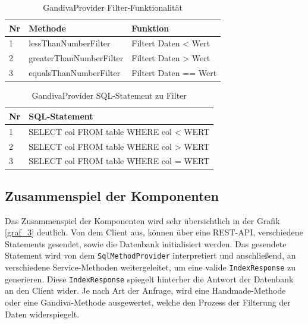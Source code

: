 \begin{table}[H]
\begin{center}
    \begin{tabular}{| l | l | l |}
    \hline
     Nr & Methode & Funktion \\ \hline
    1 & lessThanNumberFilter & Filtert Daten < Wert  \\ \hline
    2 & greaterThanNumberFilter & Filtert Daten > Wert \\ \hline
    3 & equalsThanNumberFilter & Filtert Daten == Wert  \\ \hline
    \end{tabular}
\end{center}
\caption{GandivaProvider Filter-Funktionalität}
\label{GandivaProvider Filter-Funktionalität}
\end{table}

\begin{table}[H]
\begin{center}
    \begin{tabular}{| l | l |}
    \hline
     Nr & SQL-Statement \\ \hline
    1 & SELECT col FROM table WHERE col < WERT  \\ \hline
    2 & SELECT col FROM table WHERE col > WERT  \\ \hline
    3 & SELECT col FROM table WHERE col = WERT   \\ \hline
    \end{tabular}
\end{center}
\caption{GandivaProvider SQL-Statement zu Filter}
\label{GandivaProvider SQL-Statement zu Filter}
\end{table}

\subsection{Zusammenspiel der Komponenten}
Das Zusammenspiel der Komponenten wird sehr übersichtlich in der Grafik \ref{graf_3} deutlich. Von dem Client aus, können über eine REST-API, verschiedene Statements gesendet, sowie die Datenbank initialisiert werden.
Das gesendete Statement wird von dem \texttt{SqlMethodProvider} interpretiert und anschließend, an verschiedene Service-Methoden weitergeleitet, um eine valide \texttt{IndexResponse} zu generieren. Diese \texttt{IndexResponse} spiegelt hinterher die Antwort der Datenbank an den Client wider. Je nach Art der Anfrage, wird eine Handmade-Methode oder eine Gandiva-Methode ausgewertet, welche den Prozess der Filterung der Daten widerspiegelt.


